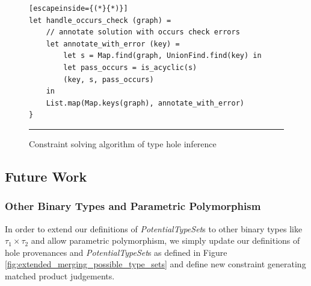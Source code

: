 \begin{figure}[h!]
\begin{lstlisting}[escapeinside={(*}{*)}]
let handle_occurs_check (graph) =
    // annotate solution with occurs check errors
    let annotate_with_error (key) =
        let s = Map.find(graph, UnionFind.find(key) in
        let pass_occurs = is_acyclic(s)
        (key, s, pass_occurs)
    in
    List.map(Map.keys(graph), annotate_with_error)
}
\end{lstlisting}
\vspace{-4px}
 \hrule
\caption{Constraint solving algorithm of type hole inference}
\label{fig:occurs_check}
\end{figure}

\subsection{Future Work}
\subsubsection{Other Binary Types and Parametric Polymorphism}
In order to extend our definitions of \emph{PotentialTypeSet}s to other binary types like $\tau_1 \times \tau_2$ and allow parametric polymorphism, we simply update our definitions of hole provenances and \emph{PotentialTypeSet}s as defined in Figure \ref{fig:extended_merging_possible_type_sets} and define new constraint generating matched product judgements.


